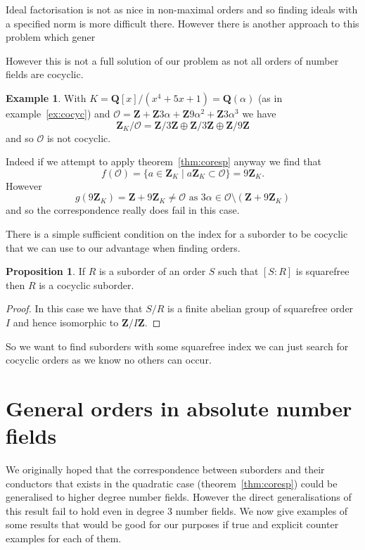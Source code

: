 \documentclass[12pt,a4paper,abstracton,bibtotoc]{scrreprt}
\theoremstyle{definition}
\newtheorem{prop}{Proposition}
\newtheorem{ex}{Example}
\newcommand{\QQ}{\mathbf{Q}}
\newcommand{\ZZ}{\mathbf{Z}}
\renewcommand{\O}{\mathcal{O}}
\begin{document}
Ideal factorisation is not as nice in non-maximal orders and so finding ideals with a specified norm is more difficult there.
However there is another approach to this problem which gener

However this is not a full solution of our problem as not all orders of number fields are cocyclic.

\begin{ex}
\label{ex:noncocyc}
With $K = \QQ[x]/(x^4 + 5x + 1) = \QQ(\alpha)$ (as in example~\ref{ex:cocyc}) and $\O = \ZZ + \ZZ3\alpha + \ZZ9\alpha^2 + \ZZ3\alpha^3$ we have
\[
\ZZ_K/\O =\ZZ/3\ZZ \oplus\ZZ/3\ZZ \oplus \ZZ/9\ZZ
\]
and so $\O$ is not cocyclic.

Indeed if we attempt to apply theorem~\ref{thm:coresp} anyway we find that 
\[
f(\O) = \{ a\in \ZZ_K \mid a\ZZ_K \subset \O \} = 9\ZZ_K.
\]
However 
\[
g(9\ZZ_K) = \ZZ + 9\ZZ_K \ne \O\text{ as } 3\alpha \in \O\setminus(\ZZ + 9\ZZ_K)
\]
and so the correspondence really does fail in this case.
\end{ex}

There is a simple sufficient condition on the index for a suborder to be cocyclic that we can use to our advantage when finding orders.

\begin{prop}
\label{prop:sqfree}
If $R$ is a suborder of an order $S$ such that $[S:R]$ is squarefree then $R$ is a cocyclic suborder.
\end{prop}

\begin{proof}
In this case we have that $S/R$ is a finite abelian group of squarefree order $I$ and hence isomorphic to $\ZZ/I\ZZ$.
\end{proof}

So we want to find suborders with some squarefree index we can just search for cocyclic orders as we know no others can occur.

\section{General orders in absolute number fields}

We originally hoped that the correspondence between suborders and their conductors that exists in the quadratic case (theorem~\ref{thm:coresp}) could be generalised to higher degree number fields.
However the direct generalisations of this result fail to hold even in degree 3 number fields.
We now give examples of some results that would be good for our purposes if true and explicit counter examples for each of them.
\end{document}
